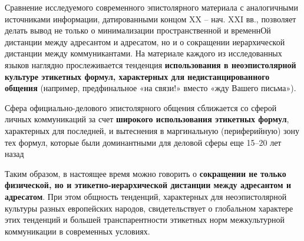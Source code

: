 Сравнение исследуемого современного эпистолярного материала с аналогичными источниками информации, датированными концом XX – нач. XXI вв., позволяет делать вывод не только о минимализации пространственной и временнОй дистанции между адресантом и адресатом, но и о сокращении
иерархической дистанции между коммуникантами. На материале каждого из исследованных языков наглядно прослеживается тенденция \textbf{использования в неоэпистолярной культуре этикетных формул, характерных для недистанцированного общения} (например, предфинальное «на связи!» вместо «жду
Вашего письма»). 

Сфера официально-делового эпистолярного общения сближается со сферой личных коммуникаций за счет \textbf{широкого использования
этикетных формул}, характерных для последней, и вытеснения в маргинальную (периферийную) зону тех формул, которые были доминантными для
деловой сферы еще 15–20 лет назад

Таким образом, в настоящее время можно говорить о \textbf{сокращении не только физической, но и этикетно-иерархической дистанции между адресантом и адресатом}. При этом общность тенденций, характерных для неоэпистолярной культуры разных европейских народов, свидетельствует о глобальном характере этих тенденций и большей транспарентности этикетных норм
межкультурной коммуникации в современных условиях.
